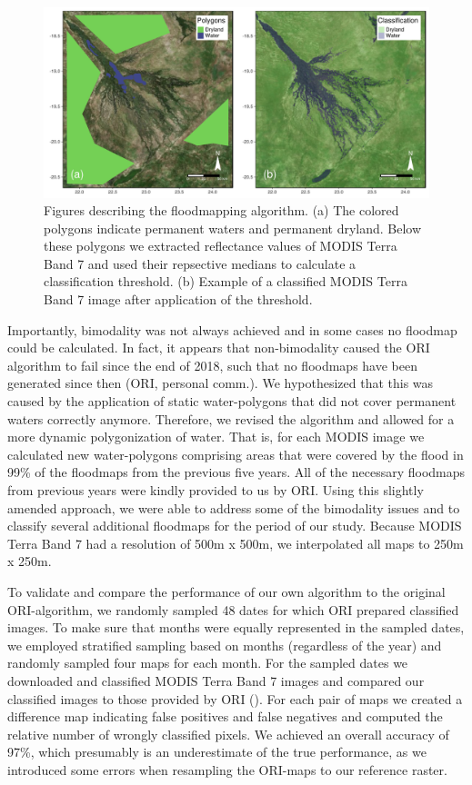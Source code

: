 \documentclass[abstract=on,10pt,a4paper,bibliography=totocnumbered]{scrartcl}
\begin{document}
\begin{figure}[h]
  \begin{center}
    \includegraphics[width = \textwidth]{99_Floodmapping.pdf}
    \caption{Figures describing the floodmapping algorithm. (a) The colored
    polygons indicate permanent waters and permanent dryland. Below these
    polygons we extracted reflectance values of MODIS Terra Band 7 and used
    their repsective medians to calculate a classification threshold. (b)
    Example of a classified MODIS Terra Band 7 image after application of the
    threshold.}
    \label{Floodmapping}
  \end{center}
\end{figure}

Importantly, bimodality was not always achieved and in some cases no floodmap
could be calculated. In fact, it appears that non-bimodality caused the ORI
algorithm to fail since the end of 2018, such that no floodmaps have been
generated since then (ORI, personal comm.). We hypothesized that this was caused
by the application of static water-polygons that did not cover permanent waters
correctly anymore. Therefore, we revised the algorithm and allowed for a more
dynamic polygonization of water. That is, for each MODIS image we calculated new
water-polygons comprising areas that were covered by the flood in 99\% of the
floodmaps from the previous five years. All of the necessary floodmaps from
previous years were kindly provided to us by ORI. Using this slightly amended
approach, we were able to address some of the bimodality issues and to classify
several additional floodmaps for the period of our study. Because MODIS Terra
Band 7 had a resolution of 500m x 500m, we interpolated all maps to 250m x 250m.

To validate and compare the performance of our own algorithm to the original
ORI-algorithm, we randomly sampled 48 dates for which ORI prepared classified
images. To make sure that months were equally represented in the sampled dates,
we employed stratified sampling based on months (regardless of the year) and
randomly sampled four maps for each month. For the sampled dates we downloaded
and classified MODIS Terra Band 7 images and compared our classified images to
those provided by ORI (). For each pair of maps we
created a difference map indicating false positives and false negatives and
computed the relative number of wrongly classified pixels. We achieved an
overall accuracy of 97\%, which presumably is an underestimate of the true
performance, as we introduced some errors when resampling the ORI-maps to our
reference raster.
\end{document}
